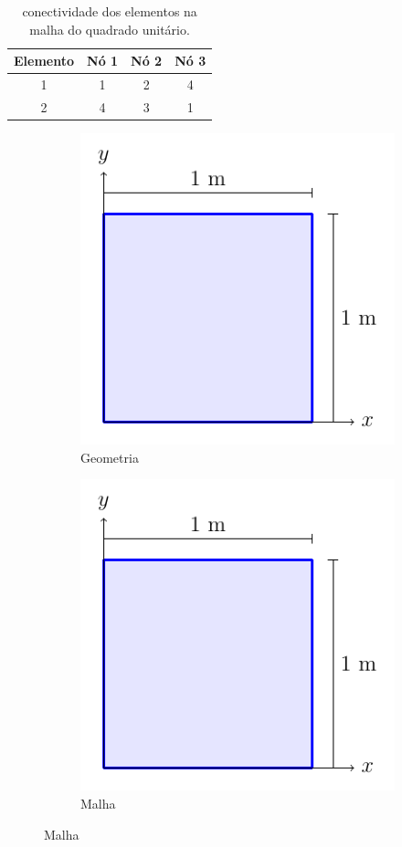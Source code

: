 \begin{table}
    \centering
    \caption{conectividade dos elementos na malha do quadrado unitário.}
    \begin{tabular}{c | c c c}
        \toprule
        \textbf{Elemento} & \textbf{Nó 1} & \textbf{Nó 2} & \textbf{Nó 3} \\
        \midrule
        1 & 1 & 2 & 4 \\
        2 & 4 & 3 & 1 \\
        \bottomrule
    \end{tabular}
    \label{tab:elementos_quadrado}
\end{table}


\begin{figure}
    \centering
    \caption{O quadrado unitário.}
    \begin{subfigure}[b]{0.45\textwidth}
        \centering
        \includegraphics[page=1]{Figuras/verificacao_quadrado.pdf}
        \caption{Geometria}
        \label{fig:verificacao_quadrado_1}
    \end{subfigure}
    \begin{subfigure}[b]{0.45\textwidth}
        \centering
        \includegraphics[page=2]{Figuras/verificacao_quadrado.pdf}
        \caption{Malha}
        \label{fig:verificacao_quadrado_2}
    \end{subfigure}
\end{figure}

